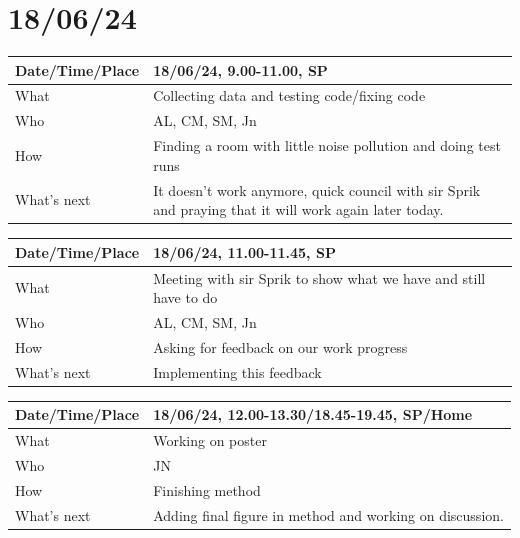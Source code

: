 \documentclass{article}
\begin{document}
\section{18/06/24}

\begin{table}[H]
\begin{tabular}{|p{1.5in}|p{4in}|}
\hline
Date/Time/Place & 18/06/24, 9.00-11.00, SP \\ \hline
What            & Collecting data and testing code/fixing code \\ \hline
Who             & AL, CM, SM, Jn \\ \hline
How             & Finding a room with little noise pollution and doing test runs\\ \hline
What's next     & It doesn't work anymore, quick council with sir Sprik and praying that it will work again later today.\\ \hline
\end{tabular}
\end{table}

\begin{table}[H]
\begin{tabular}{|p{1.5in}|p{4in}|}
\hline
Date/Time/Place & 18/06/24, 11.00-11.45, SP \\ \hline
What            & Meeting with sir Sprik to show what we have and still have to do \\ \hline
Who             & AL, CM, SM, Jn\\ \hline
How             & Asking for feedback on our work progress\\ \hline
What's next     & Implementing this feedback\\ \hline
\end{tabular}
\end{table}

\begin{table}[H]
\begin{tabular}{|p{1.5in}|p{4in}|}
\hline
Date/Time/Place & 18/06/24, 12.00-13.30/18.45-19.45, SP/Home \\ \hline
What            & Working on poster  \\ \hline
Who             & JN \\ \hline
How             & Finishing method \\ \hline
What's next     & Adding final figure in method and working on discussion.\\ \hline
\end{tabular}
\end{table}
\end{document}
